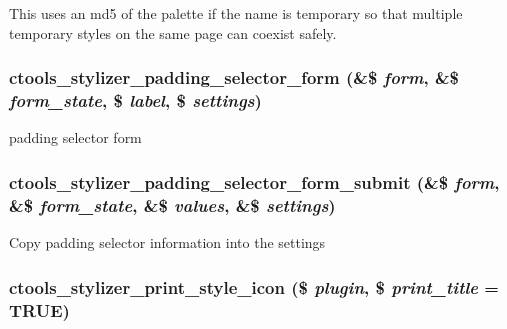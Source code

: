 This uses an md5 of the palette if the name is temporary so that multiple temporary styles on the same page can coexist safely. \hypertarget{includes_2stylizer_8inc_aa5ca96ac129122fb2201f6ef314ba77a}{
\subsubsection[{ctools\_\-stylizer\_\-padding\_\-selector\_\-form}]{\setlength{\rightskip}{0pt plus 5cm}ctools\_\-stylizer\_\-padding\_\-selector\_\-form (\&\$ {\em form}, \/  \&\$ {\em form\_\-state}, \/  \$ {\em label}, \/  \$ {\em settings})}}
\label{includes_2stylizer_8inc_aa5ca96ac129122fb2201f6ef314ba77a}
padding selector form \hypertarget{includes_2stylizer_8inc_a8283438629f3189d0669329513a61b46}{
\subsubsection[{ctools\_\-stylizer\_\-padding\_\-selector\_\-form\_\-submit}]{\setlength{\rightskip}{0pt plus 5cm}ctools\_\-stylizer\_\-padding\_\-selector\_\-form\_\-submit (\&\$ {\em form}, \/  \&\$ {\em form\_\-state}, \/  \&\$ {\em values}, \/  \&\$ {\em settings})}}
\label{includes_2stylizer_8inc_a8283438629f3189d0669329513a61b46}
Copy padding selector information into the settings \hypertarget{includes_2stylizer_8inc_af18de8af7efd4c7d25353101f67552d7}{
\subsubsection[{ctools\_\-stylizer\_\-print\_\-style\_\-icon}]{\setlength{\rightskip}{0pt plus 5cm}ctools\_\-stylizer\_\-print\_\-style\_\-icon (\$ {\em plugin}, \/  \$ {\em print\_\-title} = {\ttfamily TRUE})}}
